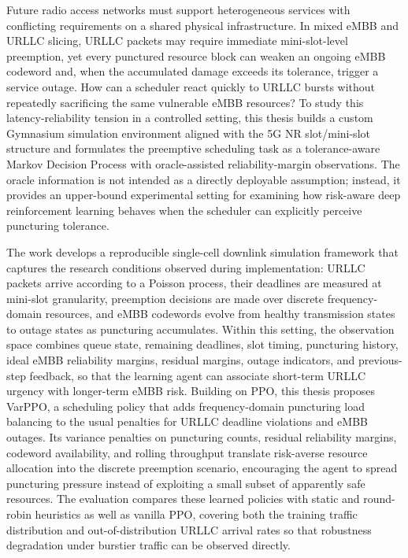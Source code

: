 \documentclass[
  type   = bachelor,
  degree = academic,
  fontset = fandol,
]{njuthesis}
\begin{document}
\begin{abstract*}
Future radio access networks must support heterogeneous services with conflicting requirements on a shared physical infrastructure. In mixed eMBB and URLLC slicing, URLLC packets may require immediate mini-slot-level preemption, yet every punctured resource block can weaken an ongoing eMBB codeword and, when the accumulated damage exceeds its tolerance, trigger a service outage. How can a scheduler react quickly to URLLC bursts without repeatedly sacrificing the same vulnerable eMBB resources? To study this latency-reliability tension in a controlled setting, this thesis builds a custom Gymnasium simulation environment aligned with the 5G NR slot/mini-slot structure and formulates the preemptive scheduling task as a tolerance-aware Markov Decision Process with oracle-assisted reliability-margin observations. The oracle information is not intended as a directly deployable assumption; instead, it provides an upper-bound experimental setting for examining how risk-aware deep reinforcement learning behaves when the scheduler can explicitly perceive puncturing tolerance.

The work develops a reproducible single-cell downlink simulation framework that captures the research conditions observed during implementation: URLLC packets arrive according to a Poisson process, their deadlines are measured at mini-slot granularity, preemption decisions are made over discrete frequency-domain resources, and eMBB codewords evolve from healthy transmission states to outage states as puncturing accumulates. Within this setting, the observation space combines queue state, remaining deadlines, slot timing, puncturing history, ideal eMBB reliability margins, residual margins, outage indicators, and previous-step feedback, so that the learning agent can associate short-term URLLC urgency with longer-term eMBB risk. Building on PPO, this thesis proposes VarPPO, a scheduling policy that adds frequency-domain puncturing load balancing to the usual penalties for URLLC deadline violations and eMBB outages. Its variance penalties on puncturing counts, residual reliability margins, codeword availability, and rolling throughput translate risk-averse resource allocation into the discrete preemption scenario, encouraging the agent to spread puncturing pressure instead of exploiting a small subset of apparently safe resources. The evaluation compares these learned policies with static and round-robin heuristics as well as vanilla PPO, covering both the training traffic distribution and out-of-distribution URLLC arrival rates so that robustness degradation under burstier traffic can be observed directly.


\end{abstract*}
\end{document}
